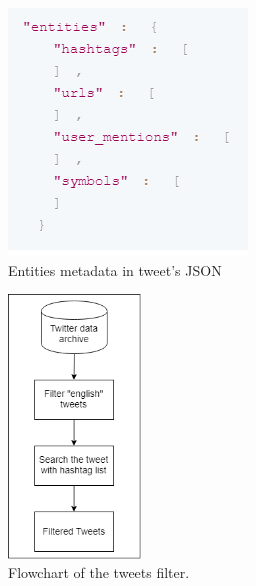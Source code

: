 \begin{figure}
    \centering
    \includegraphics[width=0.5\linewidth]{images/entities.png}
    \caption{Entities metadata in tweet's JSON}
    \label{fig:entities}
\end{figure}

\begin{figure}
    \centering
    \includegraphics[width=5cm\linewidth,height=7cm]{images/filtertweets.png}
    \caption{Flowchart of the tweets filter.}
    \label{fig:tweetsfilter}
\end{figure}


